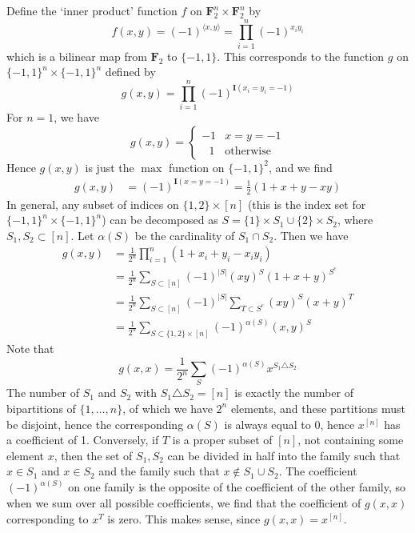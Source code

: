 \begin{example}
    Define the `inner product' function $f$ on $\mathbf{F}_2^n \times \mathbf{F}_2^n$ by
    \[ f(x,y) = (-1)^{\langle x, y \rangle} = \prod_{i = 1}^n (-1)^{x_iy_i} \]
    which is a bilinear map from $\mathbf{F}_2$ to $\{ -1, 1 \}$. This corresponds to the function $g$ on $\{ -1, 1 \}^n \times \{ -1, 1 \}^n$ defined by
    \[ g(x,y) = \prod_{i = 1}^n (-1)^{\mathbf{I}(x_i = y_i = -1)} \]
    For $n = 1$, we have
    \[ g(x,y) = \begin{cases} -1 & x = y = -1 \\ \ \ \ 1 & \text{otherwise} \end{cases} \]
    Hence $g(x,y)$ is just the $\max$ function on $\{ -1, 1 \}^2$, and we find
    \begin{align*}
        g(x,y) &= (-1)^{\mathbf{I}(x = y = -1)} = \frac{1}{2} (1 + x + y - xy)
    \end{align*}
    In general, any subset of indices on $\{ 1, 2 \} \times [n]$ (this is the index set for $\{ -1, 1 \}^n \times \{ -1, 1 \}^n$) can be decomposed as $S = \{ 1 \} \times S_1 \cup \{ 2 \} \times S_2$, where $S_1, S_2 \subset [n]$. Let $\alpha(S)$ be the cardinality of $S_1 \cap S_2$. Then we have
    \begin{align*}
        g(x,y) &= \frac{1}{2^n} \prod_{i = 1}^n (1 + x_i + y_i - x_iy_i)\\
        &= \frac{1}{2^n} \sum_{S \subset [n]} (-1)^{|S|} (xy)^S (1 + x + y)^{S^c}\\
        &= \frac{1}{2^n} \sum_{S \subset [n]} (-1)^{|S|} \sum_{T \subset S^c} (xy)^S (x + y)^T\\
        &= \frac{1}{2^n} \sum_{S \subset \{ 1, 2 \} \times [n]} (-1)^{\alpha(S)} (x,y)^S
    \end{align*}
    Note that
    \[ g(x,x) = \frac{1}{2^n} \sum_S (-1)^{\alpha(S)} x^{S_1 \triangle S_2} \]
    The number of $S_1$ and $S_2$ with $S_1 \triangle S_2 = [n]$ is exactly the number of bipartitions of $\{ 1, \dots, n \}$, of which we have $2^n$ elements, and these partitions must be disjoint, hence the corresponding $\alpha(S)$ is always equal to 0, hence $x^{[n]}$ has a coefficient of 1. Conversely, if $T$ is a proper subset of $[n]$, not containing some element $x$, then the set of $S_1,S_2$ can be divided in half into the family such that $x \in S_1$ and $x \in S_2$ and the family such that $x \not \in S_1 \cup S_2$. The coefficient $(-1)^{\alpha(S)}$ on one family is the opposite of the coefficient of the other family, so when we sum over all possible coefficients, we find that the coefficient of $g(x,x)$ corresponding to $x^T$ is zero. This makes sense, since $g(x,x) = x^{[n]}$.
\end{example}

